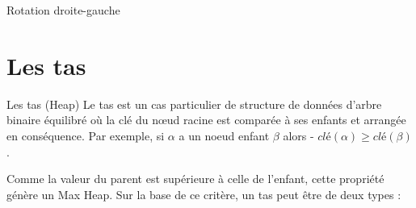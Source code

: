 \documentclass[10pt,xcolor=dvipsnames]{beamer}
\begin{document}
\begin{frame}{Rotation droite-gauche}
    
\end{frame}

\section{Les tas}

\begin{frame}{Les tas (Heap)}
    Le tas est un cas particulier de structure de données d'arbre binaire équilibré où la clé 
     du nœud racine est comparée à ses enfants et arrangée en conséquence. Par exemple, si 
     $\alpha$ a un noeud enfant $\beta$ alors - $clé(\alpha) \geq clé(\beta)$.

Comme la valeur du parent est supérieure à celle de l'enfant, cette propriété génère un \alert{Max Heap}. Sur la base de ce critère, un tas peut être de deux types :
\end{frame}
\end{document}

